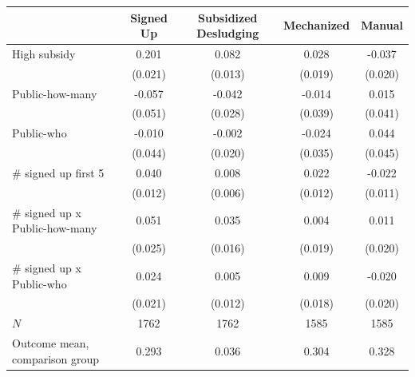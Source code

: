 \begin{tabular}{lcccc}
\hline\hline
 & Signed Up & Subsidized Desludging & Mechanized & Manual \\
\hline
High subsidy & 0.201 & 0.082 & 0.028 & -0.037 \\
 & (0.021) & (0.013) & (0.019) & (0.020) \\
Public-how-many & -0.057 & -0.042 & -0.014 & 0.015 \\
 & (0.051) & (0.028) & (0.039) & (0.041) \\
Public-who & -0.010 & -0.002 & -0.024 & 0.044 \\
 & (0.044) & (0.020) & (0.035) & (0.045) \\
# signed up first 5 & 0.040 & 0.008 & 0.022 & -0.022 \\
 & (0.012) & (0.006) & (0.012) & (0.011) \\
# signed up x Public-how-many & 0.051 & 0.035 & 0.004 & 0.011 \\
 & (0.025) & (0.016) & (0.019) & (0.020) \\
# signed up x Public-who & 0.024 & 0.005 & 0.009 & -0.020 \\
 & (0.021) & (0.012) & (0.018) & (0.020) \\
\hline
$N$ & 1762 & 1762 & 1585 & 1585 \\
Outcome mean, comparison group & 0.293 & 0.036 & 0.304 & 0.328 \\
\hline\hline
\end{tabular}
